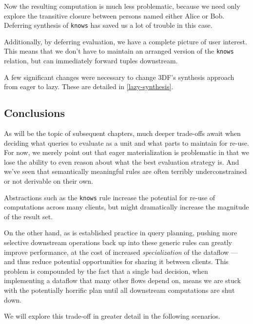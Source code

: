 \documentclass[../catalog.tex]{subfiles}
\begin{document}
Now the resulting computation is much less problematic, because we
need only explore the transitive closure between persons named either
Alice or Bob. Deferring synthesis of \texttt{knows} has saved us a lot
of trouble in this case.

Additionally, by deferring evaluation, we have a complete picture of
user interest. This means that we don't have to maintain an arranged
version of the \texttt{knows} relation, but can immediately forward
tuples downstream.

A few significant changes were necessary to change 3DF's synthesis
approach from eager to lazy. These are detailed in
\ref{lazy-synthesis}.

\subsection{Conclusions}

As will be the topic of subsequent chapters, much deeper trade-offs
await when deciding what queries to evaluate as a unit and what parts
to maintain for re-use. For now, we merely point out that eager
materialization is problematic in that we lose the ability to even
reason about what the best evaluation strategy is. And we've seen that
semantically meaningful rules are often terribly underconstrained or
not derivable on their own.

Abstractions such as the \texttt{knows} rule increase the potential
for re-use of computations across many clients, but might dramatically
increase the magnitude of the result set.

On the other hand, as is established practice in query planning,
pushing more selective downstream operations back up into these
generic rules can greatly improve performance, at the cost of
increased \emph{specialization} of the dataflow — and thus reduce
potential opportunities for sharing it between clients. This problem
is compounded by the fact that a single bad decision, when
implementing a dataflow that many other flows depend on, means we are
stuck with the potentially horrific plan until all downstream
computations are shut down.

We will explore this trade-off in greater detail in the following
scenarios.
\end{document}
